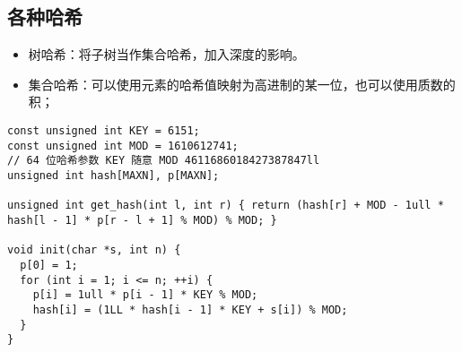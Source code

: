 \subsection{各种哈希}
\begin{itemize}
\item 树哈希：将子树当作集合哈希，加入深度的影响。
\item 集合哈希：可以使用元素的哈希值映射为高进制的某一位，也可以使用质数的积；
\end{itemize}
\begin{lstlisting}
const unsigned int KEY = 6151;
const unsigned int MOD = 1610612741;
// 64 位哈希参数 KEY 随意 MOD 4611686018427387847ll
unsigned int hash[MAXN], p[MAXN];

unsigned int get_hash(int l, int r) { return (hash[r] + MOD - 1ull * hash[l - 1] * p[r - l + 1] % MOD) % MOD; }

void init(char *s, int n) {
  p[0] = 1;
  for (int i = 1; i <= n; ++i) {
    p[i] = 1ull * p[i - 1] * KEY % MOD;
    hash[i] = (1LL * hash[i - 1] * KEY + s[i]) % MOD;
  }
}
\end{lstlisting}

